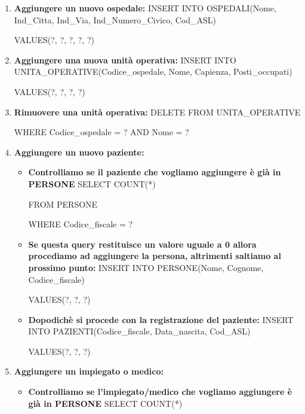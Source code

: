 \documentclass[a4paper,12pt]{report}
\begin{document}
\begin{enumerate}[leftmargin=0cm,itemindent=.5cm,labelwidth=\itemindent,labelsep=0cm,align=left]
    \item \textbf{Aggiungere un nuovo ospedale:} \newline
    INSERT INTO OSPEDALI(Nome, Ind\_Citta, Ind\_Via, Ind\_Numero\_Civico, Cod\_ASL) 

    VALUES(?, ?, ?, ?, ?)

    \item \textbf{Aggiungere una nuova unità operativa:} \newline
    INSERT INTO UNITA\_OPERATIVE(Codice\_ospedale, Nome, Capienza, Posti\_occupati)

    VALUES(?, ?, ?, ?)

    \item \textbf{Rimuovere una unità operativa:} \newline
    DELETE FROM UNITA\_OPERATIVE

    WHERE Codice\_ospedale = ? AND Nome = ?

    \item \textbf{Aggiungere un nuovo paziente:} 
    \begin{itemize}
        \item \textbf{Controlliamo se il paziente che vogliamo aggiungere è già in PERSONE} \newline
        SELECT COUNT(*)

        FROM PERSONE

        WHERE Codice\_fiscale = ?

        \item \textbf{Se questa query restituisce un valore uguale a 0 allora procediamo ad aggiungere la persona, 
        altrimenti saltiamo al prossimo punto:} \newline
        INSERT INTO PERSONE(Nome, Cognome, Codice\_fiscale)

        VALUES(?, ?, ?)

        \item \textbf{Dopodichè si procede con la registrazione del paziente:} \newline
        INSERT INTO PAZIENTI(Codice\_fiscale, Data\_nascita, Cod\_ASL)

        VALUES(?, ?, ?)

    \end{itemize}
    \item \textbf{Aggiungere un impiegato o medico:} 
    \begin{itemize}
        \item \textbf{Controlliamo se l'impiegato/medico che vogliamo aggiungere è già in PERSONE} \newline
        SELECT COUNT(*)


\end{itemize}
\end{enumerate}
\end{document}
